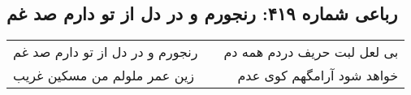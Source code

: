 \begin{center}
\section*{رباعی شماره ۴۱۹: رنجورم و در دل از تو دارم صد غم}
\label{sec:sh419}
\begin{longtable}{l p{0.5cm} r}
رنجورم و در دل از تو دارم صد غم
&&
بی لعل لبت حریف دردم همه دم
\\
زین عمر ملولم من مسکین غریب
&&
خواهد شود آرامگهم کوی عدم
\\
\end{longtable}
\end{center}
